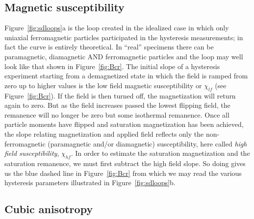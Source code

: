 \subsection{Magnetic susceptibility}
\label{sect:chi}

Figure~\ref{fig:sdloops}a is the loop created in the  idealized case in which only uniaxial ferromagnetic particles participated in the hysteresis measurements; in fact the curve is entirely theoretical.  In ``real'' specimens there can be  paramagnetic, diamagnetic AND ferromagnetic particles and the loop may well look like that shown in Figure~\ref{fig:Bcr}.   The initial slope of a hysteresis experiment starting from a demagnetized state in which the field is ramped from zero up to higher values is the low field magnetic susceptibility or $\chi_{lf}$ (see Figure~\ref{fig:Bcr}).   If the field is then turned off, the magnetization will return again to zero.  But as the field increases passed the lowest flipping field, the remanence will no longer be zero but some isothermal remanence.    Once all particle moments have flipped and saturation magnetization has been achieved, the slope relating magnetization and applied field  reflects only the non-ferromagnetic (paramagnetic and/or diamagnetic)  susceptibility, here called
 {\it high field susceptibility}, $\chi_{hf}$.   In order to estimate the 
 saturation magnetization and the 
 saturation remanence, we must first subtract the high field slope.  So doing gives us the blue dashed line in Figure~\ref{fig:Bcr} from which we may read the various hysteresis parameters illustrated in Figure~\ref{fig:sdloops}b.  



\subsection{Cubic anisotropy}

